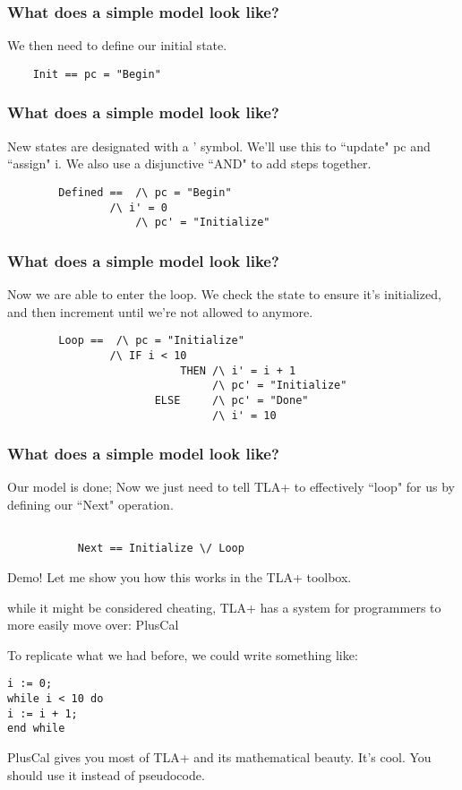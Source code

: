 \documentclass{beamer}
\begin{document}
\begin{frame}[fragile]
	\frametitle{What does a simple model look like?}
	We then need to define our initial state.
	\begin{lstlisting}
	Init == pc = "Begin"
	\end{lstlisting}


\end{frame}

\begin{frame}[fragile]
	\frametitle{What does a simple model look like?}
	New states are designated with a ' symbol.  We'll use this to ``update" pc and ``assign" i. We also use a disjunctive ``AND" to add steps together. 
	\begin{lstlisting}
        Defined ==  /\ pc = "Begin" 
	            /\ i' = 0 
                    /\ pc' = "Initialize"
	\end{lstlisting}


\end{frame}

\begin{frame}[fragile]
	\frametitle{What does a simple model look like?}
	Now we are able to enter the loop.  We check the state to ensure it's initialized, and then increment until we're not allowed to anymore. 
	\begin{lstlisting}
        Loop ==  /\ pc = "Initialize" 
	            /\ IF i < 10  
                           THEN /\ i' = i + 1 
                                /\ pc' = "Initialize"
                       ELSE     /\ pc' = "Done"
                                /\ i' = 10
	\end{lstlisting}


\end{frame}
\begin{frame}[fragile]
	\frametitle{What does a simple model look like?}
Our model is done; Now we just need to tell TLA+ to effectively ``loop" for us by defining our ``Next" operation.
	\begin{lstlisting}

           Next == Initialize \/ Loop
	\end{lstlisting}
\end{frame}
\begin{frame}{Demo!}
    Let me show you how this works in the TLA+ toolbox.
\end{frame}
\begin{frame}[PlusCal]
while it might be considered cheating, TLA+ has a system for programmers to more easily move over: PlusCal
\end{frame}
\begin{frame}[PlusCal]
To replicate what we had before, we could write something like:
\begin{lstlisting}
i := 0;
while i < 10 do
i := i + 1;
end while
\end{lstlisting}

\end{frame}

\begin{frame}[PlusCal]
PlusCal gives you most of TLA+ and its mathematical beauty.  It's cool. You should use it instead of pseudocode.
\end{frame}
\end{document}
